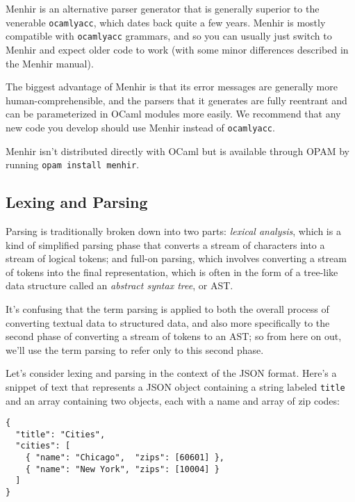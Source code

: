 Menhir is an alternative parser generator that is generally superior to
the venerable \passthrough{\lstinline!ocamlyacc!}, which dates back
quite a few years. Menhir is mostly compatible with
\passthrough{\lstinline!ocamlyacc!} grammars, and so you can usually
just switch to Menhir and expect older code to work (with some minor
differences described in the Menhir manual).

The biggest advantage of Menhir is that its error messages are generally
more human-comprehensible, and the parsers that it generates are fully
reentrant and can be parameterized in OCaml modules more easily. We
recommend that any new code you develop should use Menhir instead of
\passthrough{\lstinline!ocamlyacc!}.

Menhir isn't distributed directly with OCaml but is available through
OPAM by running \passthrough{\lstinline!opam install menhir!}.

\hypertarget{lexing-and-parsing}{%
\subsection{Lexing and Parsing}\label{lexing-and-parsing}}

Parsing is traditionally broken down into two parts: \emph{lexical
analysis}, which is a kind of simplified parsing phase that converts a
stream of characters into a stream of logical tokens; and full-on
parsing, which involves converting a stream of tokens into the final
representation, which is often in the form of a tree-like data structure
called an \emph{abstract syntax tree}, or AST.

It's confusing that the term parsing is applied to both the overall
process of converting textual data to structured data, and also more
specifically to the second phase of converting a stream of tokens to an
AST; so from here on out, we'll use the term parsing to refer only to
this second phase.

Let's consider lexing and parsing in the context of the JSON format.
Here's a snippet of text that represents a JSON object containing a
string labeled \passthrough{\lstinline!title!} and an array containing
two objects, each with a name and array of zip codes:

\begin{lstlisting}
{
  "title": "Cities",
  "cities": [
    { "name": "Chicago",  "zips": [60601] },
    { "name": "New York", "zips": [10004] }
  ]
}
\end{lstlisting}

